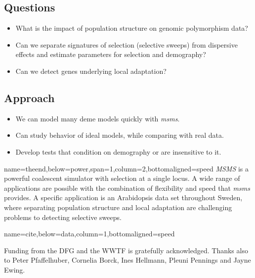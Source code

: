 \documentclass[portrait,final]{baposter}
\begin{document}
\begin{poster}
{\begin{center}
\section*{Questions}
\end{center}
\begin{itemize}
  \item What is the impact of population structure on genomic polymorphism data?
  \item Can we separate signatures of selection (selective sweeps) from
dispersive effects and estimate parameters for selection and demography?
  \item Can we detect genes underlying local adaptation?
\end{itemize}

\begin{center}
\section*{Approach}
\end{center}
\begin{itemize}
  \item We can model many deme models quickly with {\it msms}.
  \item Can study behavior of ideal models, while comparing with real data. 
  \item Develop tests that condition on demography or are insensitive to it. 
\end{itemize}

} 
 {name=theend,below=power,span=1,column=2,bottomaligned=speed}{
 \large
 {\it MSMS}\cite{ewing2010} is a powerful coalescent simulator with selection at
 a single locus. A wide range of applications are possible with the combination
 of flexibility and speed that {\it msms} provides.  A specific application
 is an Arabidopsis data set throughout Sweden, where  separating population
 structure and local adaptation are challenging problems to detecting selective 
 sweeps. 
 \vspace{.5em}
 }

{name=cite,below=data,column=1,bottomaligned=speed} { 
\small 

Funding from the DFG and the WWTF is gratefully acknowledged. Thanks also to
Peter Pfaffelhuber, Cornelia Borck, Ines Hellmann, Pleuni Pennings and Jayne
Ewing.

\vspace{-1.2cm}

\renewcommand\refname{}

}


\end{poster}%
\end{document}
